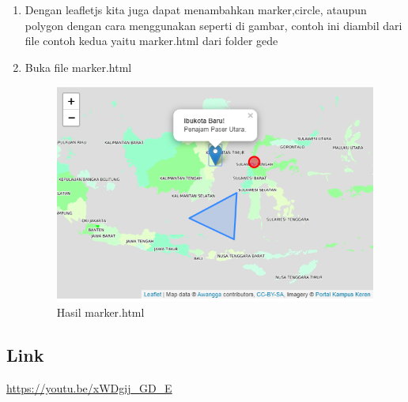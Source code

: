 \begin{enumerate}
	\item Dengan leafletjs kita juga dapat menambahkan marker,circle, ataupun polygon dengan cara menggunakan seperti di gambar, contoh ini diambil
          dari file contoh kedua yaitu marker.html dari folder gede 
    \hfill\break
	
	\item Buka file marker.html
    \hfill\break
	\begin{figure}[H]
		\includegraphics[width=12cm]{figures/Tugas5/1174076/4.png}
		\centering
		\caption{Hasil marker.html}
	\end{figure}
\end{enumerate}

\subsection{Link}
\url{https://youtu.be/xWDgij_GD_E}
  
